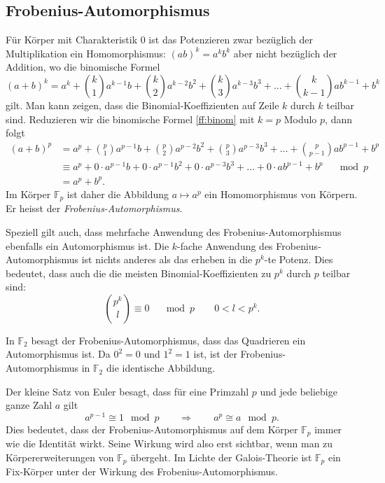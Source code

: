 \subsection{Frobenius-Automorphismus}
Für Körper mit Charakteristik $0$ ist das Potenzieren zwar bezüglich der
Multiplikation ein Homomorphismus:
$
(ab)^k = a^kb^k
$
aber nicht bezüglich der Addition, wo die binomische Formel
\begin{equation}
(a+b)^k
= 
a^k + \binom{k}{1} a^{k-1}b + \binom{k}{2} a^{k-2}b^2
+ \binom{k}{3}a^{k-3}b^3 + \dots + \binom{k}{k-1}ab^{k-1} + b^k
\label{ff:binom}
\end{equation}
gilt.
Man kann zeigen, dass die Binomial-Koeffizienten auf Zeile $k$ durch 
$k$ teilbar sind.
Reduzieren wir die binomische Formel \eqref{ff:binom} mit $k=p$ Modulo $p$,
dann folgt
\begin{align*}
(a+b)^p
&= 
a^p + \binom{p}{1} a^{p-1}b + \binom{p}{2} a^{p-2}b^2
+ \binom{p}{3}a^{p-3}b^3 + \dots + \binom{p}{p-1}ab^{p-1} + b^p
\\
&\equiv
a^p + 0\cdot a^{p-1}b + 0\cdot a^{p-1}b^2
+ 0\cdot a^{p-3}b^3 + \dots + 0\cdot ab^{p-1} + b^p
\quad\mod p
\\
&=
a^p + b^p.
\end{align*}
Im Körper $\mathbb F_p$ ist daher die Abbildung $a\mapsto a^p$
ein Homomorphismus von Körpern.
Er heisst der {\em Frobenius-Automorphismus}.

Speziell gilt auch, dass mehrfache Anwendung des Frobenius-Automorphismus
ebenfalls ein Automorphismus ist.
Die $k$-fache Anwendung des Frobenius-Automorphismus ist nichts anderes
als das erheben in die $p^k$-te Potenz.
Dies bedeutet, dass auch die die meisten Binomial-Koeffizienten zu $p^k$ 
durch $p$ teilbar sind:
\[
\binom{p^k}{l}\equiv 0\quad\mod p
\qquad
0<l<p^k.
\]

\begin{beispiel}
In $\mathbb F_2$ besagt der Frobenius-Automorphismus, dass das Quadrieren
ein Automorphismus ist.
Da $0^2=0$ und $1^2=1$ ist, ist der Frobenius-Automorphismus in $\mathbb F_2$
die identische Abbildung.
\end{beispiel}

Der kleine Satz von Euler besagt, dass für eine Primzahl $p$ und jede
beliebige ganze Zahl $a$ gilt
\[
a^{p-1}\cong 1\mod p
\qquad\Rightarrow\qquad
a^p\cong a\mod p.
\]
Dies bedeutet, dass der Frobenius-Automorphismus auf dem Körper $\mathbb F_p$
immer wie die Identität wirkt.
Seine Wirkung wird also erst sichtbar, wenn man zu Körpererweiterungen
von $\mathbb F_p$ übergeht.
Im Lichte der Galois-Theorie ist $\mathbb F_p$ ein Fix-Körper
unter der Wirkung des Frobenius-Automorphismus.

